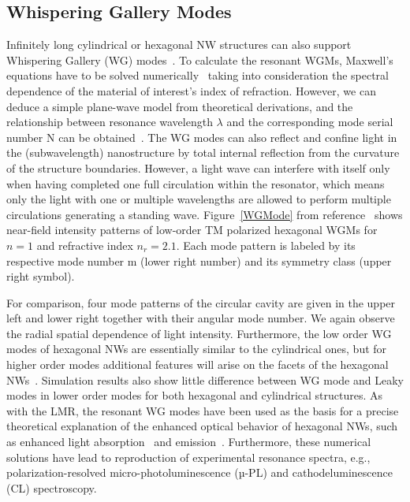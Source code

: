 \subsection{Whispering Gallery Modes}
\label{sec:WGM}

Infinitely long cylindrical or hexagonal NW structures can also support
Whispering Gallery (WG)
modes~\cite{Zimmler:2008fc,huang2001room,Zhao:2014jt,Nobis:2005wg,Czekalla:2010uw,Gargas:2009cx,Fallert:2008ej,Johnson:2002ua,Nobis:2004tp}.
To calculate the resonant WGMs, Maxwell’s equations have to be solved
numerically~\cite{Wiersig:2003vo} taking into consideration the spectral
dependence of the material of interest’s index of refraction. However, we can
deduce a simple plane-wave model from theoretical derivations, and the
relationship between resonance wavelength $\lambda$ and the corresponding mode
serial number N can be obtained~\cite{Nobis:2004tp}. The WG modes can also
reflect and confine light in the (subwavelength) nanostructure by total
internal reflection from the curvature of the structure boundaries. However, a
light wave can interfere with itself only when having completed one full
circulation within the resonator, which means only the light with one or
multiple wavelengths are allowed to perform multiple circulations generating a
standing wave.  Figure~\ref{WGMode} from reference~\cite{Nobis:2005wg} shows
near-field intensity patterns of low-order TM polarized hexagonal WGMs for $n =
1$ and refractive index $n_r = 2.1$. Each mode pattern is labeled by its
respective mode number m (lower right number) and its symmetry class (upper
right symbol).

For comparison, four mode patterns of the circular cavity are given in the
upper left and lower right together with their angular mode number. We again
observe the radial spatial dependence of light intensity. Furthermore, the low
order WG modes of hexagonal NWs are essentially similar to the cylindrical
ones, but for higher order modes additional features will arise on the facets
of the hexagonal NWs~\cite{Nobis:2005wg}. Simulation results also show little
difference between WG mode and Leaky modes in lower order modes for both
hexagonal and cylindrical structures. As with the LMR, the resonant WG modes
have been used as the basis for a precise theoretical explanation of the
enhanced optical behavior of hexagonal NWs, such as enhanced light
absorption~\cite{Cao:2009ho,Kim:2014ig,Zhang:2013wb,Kelzenberg:2010fa,Wang:2013ux}
and emission~\cite{Zimmler:2008fc,Currie:2013to,Le:2014cp,Grzela:2012wa}.
Furthermore, these numerical solutions have lead to reproduction of
experimental resonance spectra, e.g., polarization-resolved
micro-photoluminescence (µ-PL) and cathodeluminescence (CL) spectroscopy.

